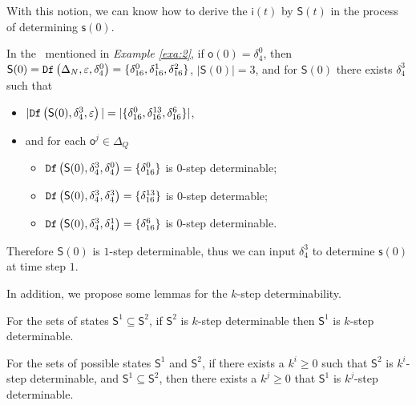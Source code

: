 With this notion, we can know how to derive the $\mathsf{i}(t)$ by $\mathsf{S}(t)$ in the process of determining $\mathsf{s}(0)$. 
\begin{example}\label{exa:9}
In the \BCN\ mentioned in {\em Example \ref{exa:2}}, if $\mathsf{o}(0)=\delta_4^0$, then $\mathsf{S}(0)={\tt Df}\left(\Delta_N,\varepsilon,\delta_4^0\right)=\{\delta_{16}^0,\delta_{16}^1,\delta_{16}^2\}$, $|\mathsf{S}(0)|=3$, and for $\mathsf{S}(0)$ there exists $\delta_{4}^3$ such that 
 \begin{itemize}
 \item  $|{\tt Df}\left(\mathsf{S}(0),\delta_{4}^3,\varepsilon\right)|=|\{\delta_{16}^0,\delta_{16}^{13},\delta_{16}^6\}|$,
 \item   and for each $\mathsf{o}^{j}\in \Delta_Q$
  \begin{itemize}
  \item   ${\tt Df}\left(\mathsf{S}(0),\delta_{4}^3,\delta_{4}^0\right)=\{\delta_{16}^0\}$ is $0$-step determinable;
 \item  ${\tt Df}\left(\mathsf{S}(0),\delta_{4}^3,\delta_{4}^3\right)=\{\delta_{16}^{13}\}$ is $0$-step determable;
  \item  ${\tt Df}\left(\mathsf{S}(0),\delta_{4}^3,\delta_{4}^1\right)=\{\delta_{16}^{6}\}$ is $0$-step determinable.
 \end{itemize}
 \end{itemize}
 Therefore $\mathsf{S}(0)$ is $1$-step determinable, thus we can  input $\delta_{4}^3$ to determine $\mathsf{s}(0)$ at time step $1$.
\end{example}  

In addition, we propose some lemmas for the $k$-step determinability.

\begin{lemma}
For the sets of states $\mathsf{S}^{1}\subseteq \mathsf{S}^{2}$, if $\mathsf{S}^{2}$ is $k$-step determinable %
then $\mathsf{S}^{1}$ is $k$-step determinable.
  \label{lemm:1}
\end{lemma}

\begin{lemma}
For the sets of possible states $\mathsf{S}^{1}$ and $\mathsf{S}^{2}$, if there exists a $k^{i}\ge 0$ such that $\mathsf{S}^{2}$ is $k^{i}$-step determinable, and $\mathsf{S}^{1}\subseteq \mathsf{S}^{2}$, then there exists a $k^{j}\ge 0$ that $\mathsf{S}^{1}$ is $k^{j}$-step determinable.
\label{lemm:2}
\end{lemma}


